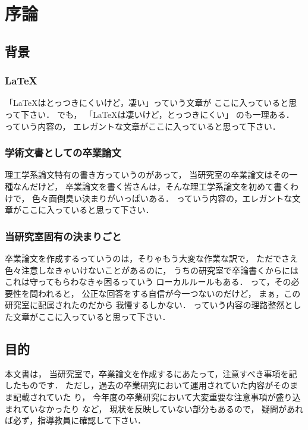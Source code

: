 \documentclass[a4j,12pt,dvipdfmx,oneside]{jsbook}
\theoremstyle{definition}
\begin{document}
\pagestyle{headings}
\def\thepage{\roman{page}}

\tableofcontents
\listoffigures
\listoftables
\newpage
\pagestyle{myheadings}
%
%
%
\chapter{序論}
\def\thepage{\arabic{page}}
\setcounter{page}{1}
\label{chap:first}
%
%
%
\section{背景}\label{sec:background}
%
%
%
\subsection{\LaTeX}\label{subsec:latex}
%
%
%
「\LaTeX{}はとっつきにくいけど，凄い」っていう文章が
ここに入っていると思って下さい．
でも，
「\LaTeX{}は凄いけど，とっつきにくい」
のも一理ある．
っていう内容の，
エレガントな文章がここに入っていると思って下さい．
%
%
%
\subsection{学術文書としての卒業論文}\label{subsec:academic_statement}
%
%
%
理工学系論文特有の書き方っていうのがあって，
当研究室の卒業論文はその一種なんだけど，
卒業論文を書く皆さんは，そんな理工学系論文を初めて書くわけで，
色々面倒臭い決まりがいっぱいある．
っていう内容の，エレガントな文章がここに入っていると思って下さい．
%
%
%
\subsection{当研究室固有の決まりごと}
%
%
%
卒業論文を作成するっていうのは，そりゃもう大変な作業な訳で，
ただでさえ色々注意しなきゃいけないことがあるのに，
うちの研究室で卒論書くからにはこれは守ってもらわなきゃ困るっていう
ローカルルールもある．
って，その必要性を問われると，
公正な回答をする自信が今一つないのだけど，
まぁ，この研究室に配属されたのだから
我慢するしかない．
っていう内容の理路整然とした文章がここに入っていると思って下さい．
%
%
%
\section{目的}\label{sec:purpose}
%
%
%
本文書は，
当研究室で，卒業論文を作成するにあたって，注意すべき事項を記したものです．
ただし，過去の卒業研究において運用されていた内容がそのまま記載されていた
り，
今年度の卒業研究において大変重要な注意事項が盛り込まれていなかったり
など，
現状を反映していない部分もあるので，
疑問があれば必ず，指導教員に確認して下さい．
%
%
%
\end{document}
